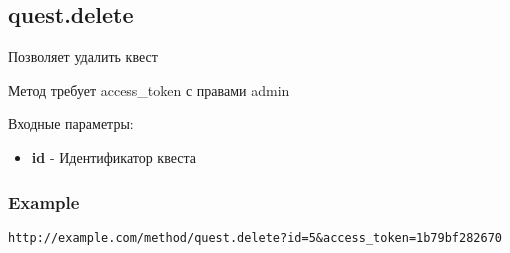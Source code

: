 \subsection{quest.delete}
Позволяет удалить квест

Метод требует access\_token с правами admin

Входные параметры:
\begin{itemize}
  \item \textbf{id} - Идентификатор квеста
\end{itemize}

\subsubsection{Example}
\begin{Verbatim}[frame=single]
http://example.com/method/quest.delete?id=5&access_token=1b79bf282670
\end{Verbatim}